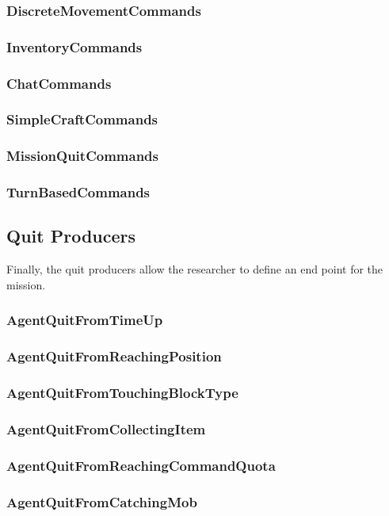 \documentclass[11pt]{article} %
\begin{document}
\subsubsection{DiscreteMovementCommands}
\subsubsection{InventoryCommands}
\subsubsection{ChatCommands}
\subsubsection{SimpleCraftCommands}
\subsubsection{MissionQuitCommands}
\subsubsection{TurnBasedCommands}

\subsection{Quit Producers}
Finally, the quit producers allow the researcher to define an end point for the mission.
\subsubsection{AgentQuitFromTimeUp}
\subsubsection{AgentQuitFromReachingPosition}
\subsubsection{AgentQuitFromTouchingBlockType}
\subsubsection{AgentQuitFromCollectingItem}
\subsubsection{AgentQuitFromReachingCommandQuota}
\subsubsection{AgentQuitFromCatchingMob}
\end{document}
